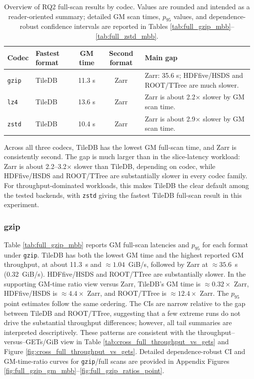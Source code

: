 \documentclass[nomenclature, english, bibtex]{kththesis}
\numberwithin{listing}{chapter}
\begin{document}
\begin{table}[H]
  \centering
  \small
  \caption{Overview of RQ2 full-scan results by codec. Values are rounded and intended as a reader-oriented summary; detailed \gls{GM} scan times, $p_{95}$ values, and dependence-robust confidence intervals are reported in Tables \ref{tab:full_gzip_mbb}--\ref{tab:full_zstd_mbb}.}
  \label{tab:rq2_full_overview}
  \begin{tabularx}{\linewidth}{@{} l l c c X @{}}
    \toprule
    Codec & Fastest format & \gls{GM} time & Second format & Main gap \\
    \midrule
    \texttt{gzip} & TileDB & 11.3 s & Zarr & Zarr: 35.6 s; \gls{HDFfive}/\gls{HSDS} and \gls{ROOT}/\gls{TTree} are much slower. \\
    \texttt{lz4}  & TileDB & 13.6 s & Zarr & Zarr is about 2.2$\times$ slower by \gls{GM} scan time. \\
    \texttt{zstd} & TileDB & 10.4 s & Zarr & Zarr is about 2.9$\times$ slower by \gls{GM} scan time. \\
    \bottomrule
  \end{tabularx}
\end{table}

Across all three codecs, TileDB has the lowest \gls{GM} full-scan time, and Zarr is consistently second. The gap is much larger than in the slice-latency workload: Zarr is about 2.2--3.2$\times$ slower than TileDB, depending on codec, while \gls{HDFfive}/\gls{HSDS} and \gls{ROOT}/\gls{TTree} are substantially slower in every codec family. For throughput-dominated workloads, this makes TileDB the clear default among the tested backends, with \texttt{zstd} giving the fastest TileDB full-scan result in this experiment.

\subsubsection{gzip}
Table \ref{tab:full_gzip_mbb} reports \gls{GM} full-scan latencies and $p_{95}$ for each format under \texttt{gzip}. TileDB has both the lowest \gls{GM} time and the highest reported \gls{GM} throughput, at about 11.3~s and $\approx 1.04$~GiB/s, followed by Zarr at $\approx 35.6$~s (0.32~GiB/s). \gls{HDFfive}/\gls{HSDS} and \gls{ROOT}/\gls{TTree} are substantially slower. In the supporting \gls{GM}-time ratio view versus Zarr, TileDB’s \gls{GM} time is $\approx 0.32\times$ Zarr, \gls{HDFfive}/\gls{HSDS} is $\approx 4.4\times$ Zarr, and \gls{ROOT}/\gls{TTree} is $\approx 12.4\times$ Zarr. The $p_{95}$ point estimates follow the same ordering. The CIs are narrow relative to the gap between TileDB and \gls{ROOT}/\gls{TTree}, suggesting that a few extreme runs do not drive the substantial throughput differences; however, all tail summaries are interpreted descriptively. These patterns are consistent with the throughput–versus–GETs/GiB view in Table \ref{tab:cross_full_throughput_vs_gets} and Figure \ref{fig:cross_full_throughput_vs_gets}. Detailed dependence-robust \gls{CI} and \gls{GM}-time-ratio curves for \texttt{gzip}/full scans are provided in Appendix Figures \ref{fig:full_gzip_gm_mbb}–\ref{fig:full_gzip_ratios_point}.
\end{document}
